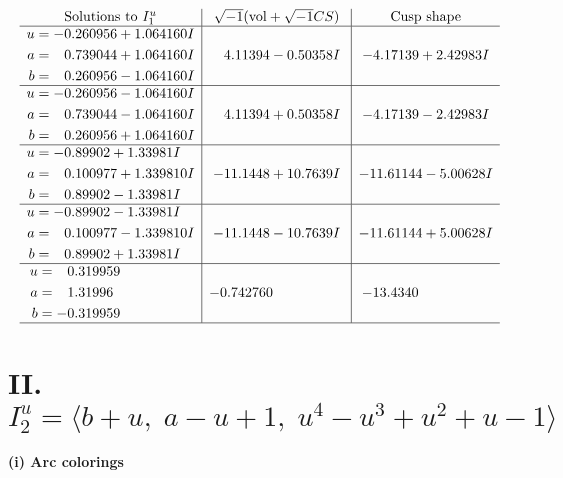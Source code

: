 \documentclass[1p]{elsarticle_modified}
\theoremstyle{definition}
\newcommand{\I}{\sqrt{-1}}
\begin{document}
$$\begin{array}{c|c|c}  
\text{Solutions to }I^u_{1}& \I (\text{vol} + \sqrt{-1}CS) & \text{Cusp shape}\\
 \hline 
\begin{aligned}
u &= -0.260956 + 1.064160 I \\
a &= \phantom{-}0.739044 + 1.064160 I \\
b &= \phantom{-}0.260956 - 1.064160 I\end{aligned}
 & \phantom{-}4.11394 - 0.50358 I & -4.17139 + 2.42983 I \\ \hline\begin{aligned}
u &= -0.260956 - 1.064160 I \\
a &= \phantom{-}0.739044 - 1.064160 I \\
b &= \phantom{-}0.260956 + 1.064160 I\end{aligned}
 & \phantom{-}4.11394 + 0.50358 I & -4.17139 - 2.42983 I \\ \hline\begin{aligned}
u &= -0.89902 + 1.33981 I \\
a &= \phantom{-}0.100977 + 1.339810 I \\
b &= \phantom{-}0.89902 - 1.33981 I\end{aligned}
 & -11.1448 + 10.7639 I & -11.61144 - 5.00628 I \\ \hline\begin{aligned}
u &= -0.89902 - 1.33981 I \\
a &= \phantom{-}0.100977 - 1.339810 I \\
b &= \phantom{-}0.89902 + 1.33981 I\end{aligned}
 & -11.1448 - 10.7639 I & -11.61144 + 5.00628 I \\ \hline\begin{aligned}
u &= \phantom{-}0.319959\phantom{ +0.000000I} \\
a &= \phantom{-}1.31996\phantom{ +0.000000I} \\
b &= -0.319959\phantom{ +0.000000I}\end{aligned}
 & -0.742760\phantom{ +0.000000I} & -13.4340\phantom{ +0.000000I}\\
 \hline 
 \end{array}$$\newpage\newpage\renewcommand{\arraystretch}{1}
\centering \section*{II. $I^u_{2}= \langle b+u,\;a- u+1,\;u^4- u^3+u^2+u-1 \rangle$}
\flushleft \textbf{(i) Arc colorings}\\
\end{document}
